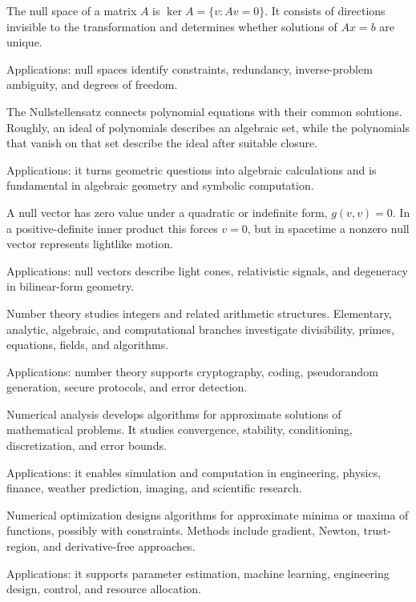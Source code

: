 The null space of a matrix $A$ is $\ker A=\{v:Av=0\}$. It consists of directions invisible to the transformation and determines whether solutions of $Ax=b$ are unique. \par\noindent Applications: null spaces identify constraints, redundancy, inverse-problem ambiguity, and degrees of freedom.

The Nullstellensatz connects polynomial equations with their common solutions. Roughly, an ideal of polynomials describes an algebraic set, while the polynomials that vanish on that set describe the ideal after suitable closure. \par\noindent Applications: it turns geometric questions into algebraic calculations and is fundamental in algebraic geometry and symbolic computation.

A null vector has zero value under a quadratic or indefinite form, $g(v,v)=0$. In a positive-definite inner product this forces $v=0$, but in spacetime a nonzero null vector represents lightlike motion. \par\noindent Applications: null vectors describe light cones, relativistic signals, and degeneracy in bilinear-form geometry.

Number theory studies integers and related arithmetic structures. Elementary, analytic, algebraic, and computational branches investigate divisibility, primes, equations, fields, and algorithms. \par\noindent Applications: number theory supports cryptography, coding, pseudorandom generation, secure protocols, and error detection.

Numerical analysis develops algorithms for approximate solutions of mathematical problems. It studies convergence, stability, conditioning, discretization, and error bounds. \par\noindent Applications: it enables simulation and computation in engineering, physics, finance, weather prediction, imaging, and scientific research.

Numerical optimization designs algorithms for approximate minima or maxima of functions, possibly with constraints. Methods include gradient, Newton, trust-region, and derivative-free approaches. \par\noindent Applications: it supports parameter estimation, machine learning, engineering design, control, and resource allocation.

